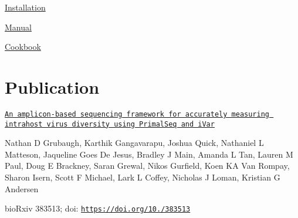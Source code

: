 
\begin{DoxyItemize}
\item \mbox{\hyperlink{installpage}{Installation}}
\item \mbox{\hyperlink{manualpage}{Manual}}
\item \mbox{\hyperlink{cookbookpage}{Cookbook}}
\end{DoxyItemize}\hypertarget{index_autotoc_md21}{}\section{Publication}\label{index_autotoc_md21}
\href{https://doi.org/10.1101/383513}{\tt An amplicon-\/based sequencing framework for accurately measuring intrahost virus diversity using Primal\+Seq and i\+Var}

Nathan D Grubaugh, Karthik Gangavarapu, Joshua Quick, Nathaniel L Matteson, Jaqueline Goes De Jesus, Bradley J Main, Amanda L Tan, Lauren M Paul, Doug E Brackney, Saran Grewal, Nikos Gurfield, Koen KA Van Rompay, Sharon Isern, Scott F Michael, Lark L Coffey, Nicholas J Loman, Kristian G Andersen

bio\+Rxiv 383513; doi\+: \href{https://doi.org/10.1101/383513}{\tt https\+://doi.\+org/10./383513} 